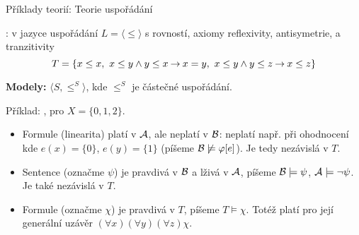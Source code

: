 \documentclass{beamer}
\begin{document}
\begin{frame}{Příklady teorií: Teorie uspořádání}

    : v jazyce uspořádání $L=\langle\leq\rangle$ s rovností, axiomy \alert{reflexivity}, \alert{antisymetrie}, a \alert{tranzitivity}
    {\small
    $$
    T=\{ x\leq x,\ x\leq y\land y\leq x\mathbin{\rightarrow} x=y,\ x\leq y\land y\leq z\mathbin{\rightarrow} x\leq z\}
    $$
    }

    \vspace{-6pt}

    \textbf{Modely:} $\langle S,\leq^S\rangle$, kde $\leq^S$ je \alert{částečné uspořádání}. 
    
    Příklad: ,  pro $X=\{0,1,2\}$.
    \begin{itemize}
        \item Formule  (\alert{linearita}) platí v $\mathcal{A}$, ale neplatí v $\mathcal{B}$: neplatí např. při ohodnocení kde $e(x)=\{0\}$, $e(y)=\{1\}$ (píšeme $\mathcal{B}\not\models\varphi[e]$). Je tedy nezávislá v $T$.
        \item Sentence  (označme $\psi$) je pravdivá v $\mathcal{B}$ a lživá v $\mathcal{A}$, píšeme $\mathcal{B}\models\psi$, $\mathcal{A}\models\neg\psi$. Je také nezávislá v $T$.
        \item Formule  (označme  $\chi$) je pravdivá v $T$, píšeme $T\models\chi$. Totéž platí pro její \alert{generální uzávěr} $(\forall x)(\forall y)(\forall z)\chi$.
    \end{itemize}

\end{frame}
\end{document}
